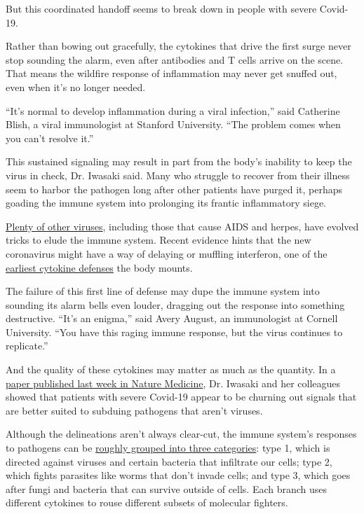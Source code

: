 But this coordinated handoff seems to break down in people with severe
Covid-19.

Rather than bowing out gracefully, the cytokines that drive the first
surge never stop sounding the alarm, even after antibodies and T cells
arrive on the scene. That means the wildfire response of inflammation
may never get snuffed out, even when it's no longer needed.

``It's normal to develop inflammation during a viral infection,'' said
Catherine Blish, a viral immunologist at Stanford University. ``The
problem comes when you can't resolve it.''

This sustained signaling may result in part from the body's inability to
keep the virus in check, Dr. Iwasaki said. Many who struggle to recover
from their illness seem to harbor the pathogen long after other patients
have purged it, perhaps goading the immune system into prolonging its
frantic inflammatory siege.

\href{https://www.nytimes.com/2020/07/31/opinion/coronavirus-antibodies-immunity.html}{Plenty
of other viruses}, including those that cause AIDS and herpes, have
evolved tricks to elude the immune system. Recent evidence hints that
the new coronavirus might have a way of delaying or muffling interferon,
one of the
\href{https://www.biorxiv.org/content/10.1101/2020.05.11.088179v1}{earliest
cytokine defenses} the body mounts.

The failure of this first line of defense may dupe the immune system
into sounding its alarm bells even louder, dragging out the response
into something destructive. ``It's an enigma,'' said Avery August, an
immunologist at Cornell University. ``You have this raging immune
response, but the virus continues to replicate.''

And the quality of these cytokines may matter as much as the quantity.
In a \href{https://www.nature.com/articles/s41586-020-2588-y}{paper
published last week in Nature Medicine}, Dr. Iwasaki and her colleagues
showed that patients with severe Covid-19 appear to be churning out
signals that are better suited to subduing pathogens that aren't
viruses.

Although the delineations aren't always clear-cut, the immune system's
responses to pathogens can be
\href{https://www.jacionline.org/article/S0091-6749(14)01585-1/fulltext}{roughly
grouped into three categories}: type 1, which is directed against
viruses and certain bacteria that infiltrate our cells; type 2, which
fights parasites like worms that don't invade cells; and type 3, which
goes after fungi and bacteria that can survive outside of cells. Each
branch uses different cytokines to rouse different subsets of molecular
fighters.

